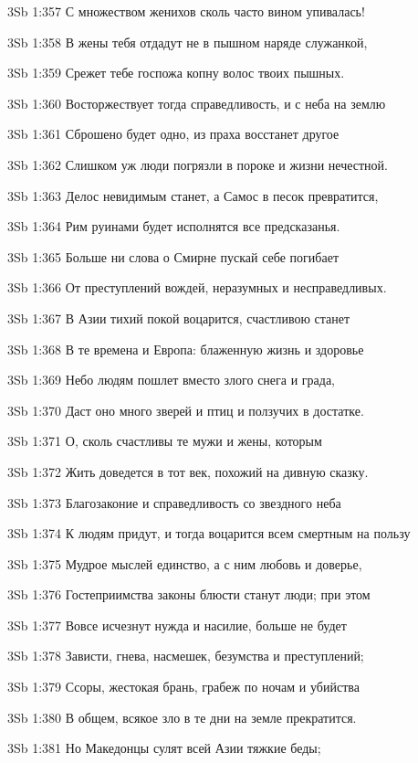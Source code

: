 \vs 3Sb 1:357 С множеством женихов сколь часто вином упивалась!  

\vs 3Sb 1:358 В жены тебя отдадут не в пышном наряде  служанкой, 

\vs 3Sb 1:359 Срежет тебе госпожа копну волос твоих пышных.

\vs 3Sb 1:360 Восторжествует тогда справедливость, и с неба на землю

\vs 3Sb 1:361 Сброшено будет одно, из праха восстанет другое  

\vs 3Sb 1:362 Слишком уж люди погрязли в пороке и жизни нечестной.

\vs 3Sb 1:363 Делос невидимым станет, а Самос в песок превратится, 

\vs 3Sb 1:364 Рим руинами будет  исполнятся все предсказанья. 

\vs 3Sb 1:365 Больше ни слова о Смирне  пускай себе погибает 

\vs 3Sb 1:366 От преступлений вождей, неразумных и несправедливых.

\vs 3Sb 1:367 В Азии тихий покой воцарится, счастливою станет 

\vs 3Sb 1:368 В те времена и Европа: блаженную жизнь и здоровье 

\vs 3Sb 1:369 Небо людям пошлет вместо злого снега и града,

\vs 3Sb 1:370 Даст оно много зверей и птиц и ползучих в достатке.

\vs 3Sb 1:371 О, сколь счастливы те мужи и жены, которым 

\vs 3Sb 1:372 Жить доведется в тот век, похожий на дивную сказку.

\vs 3Sb 1:373 Благозаконие и справедливость со звездного неба 

\vs 3Sb 1:374 К людям придут, и тогда воцарится всем смертным на пользу

\vs 3Sb 1:375 Мудрое мыслей единство, а с ним  любовь и доверье,

\vs 3Sb 1:376 Гостеприимства законы блюсти станут люди; при этом 

\vs 3Sb 1:377 Вовсе исчезнут нужда и насилие, больше не будет 

\vs 3Sb 1:378 Зависти, гнева, насмешек, безумства и преступлений; 

\vs 3Sb 1:379 Ссоры, жестокая брань, грабеж по ночам и убийства 

\vs 3Sb 1:380 В общем, всякое зло в те дни на земле прекратится. 

\vs 3Sb 1:381 Но Македонцы сулят всей Азии тяжкие беды; 

